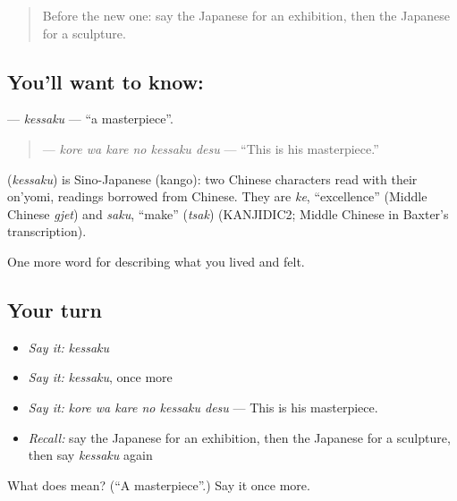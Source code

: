 \label{lesson:JA-C468-kessaku}



\begin{quote}
Before the new one: say the Japanese for an exhibition, then the Japanese for a sculpture.
\end{quote}

\subsection*{You'll want to know: }
\textbf{} — \emph{kessaku} — \textquotedblleft{}a masterpiece\textquotedblright{}.

\begin{quote}
\textbf{  } — \emph{kore wa kare no kessaku desu} — \textquotedblleft{}This is his masterpiece.\textquotedblright{}
\end{quote}

\begin{cousinweb}
\textbf{} (\emph{kessaku}) is Sino-Japanese (kango): two Chinese characters read with their on'yomi, readings borrowed from Chinese. They are \emph{ke}, \textquotedblleft{}excellence\textquotedblright{} (Middle Chinese \emph{gjet}) and \emph{saku}, \textquotedblleft{}make\textquotedblright{} (\emph{tsak}) (KANJIDIC2; Middle Chinese in Baxter's transcription).
\end{cousinweb}

\begin{grammarlens}[title={What you've built}]
One more word for describing what you lived and felt.
\end{grammarlens}

\subsection*{Your turn}
\begin{itemize}
\raggedright
  \item \emph{Say it:} \emph{kessaku}
  \item \emph{Say it:} \emph{kessaku}, once more
  \item \emph{Say it:} \emph{kore wa kare no kessaku desu} — This is his masterpiece.
  \item \emph{Recall:} say the Japanese for an exhibition, then the Japanese for a sculpture, then say \emph{kessaku} again
\end{itemize}

\begin{tcolorbox}[breakable,colback=teal!4,colframe=teal!35!black,title={Before you move on}]
What does  mean? (\textquotedblleft{}A masterpiece\textquotedblright{}.) Say it once more.
\end{tcolorbox}
